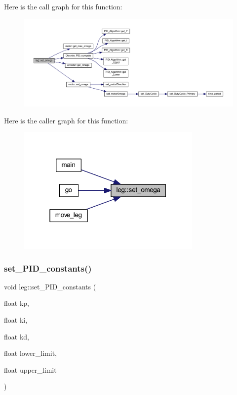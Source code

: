 Here is the call graph for this function\+:
\nopagebreak
\begin{figure}[H]
\begin{center}
\leavevmode
\includegraphics[width=350pt]{classleg_a0b0845622d8b17f34739b390846bf957_cgraph}
\end{center}
\end{figure}
Here is the caller graph for this function\+:
\nopagebreak
\begin{figure}[H]
\begin{center}
\leavevmode
\includegraphics[width=256pt]{classleg_a0b0845622d8b17f34739b390846bf957_icgraph}
\end{center}
\end{figure}
\mbox{\label{classleg_ad783f2af37d09757d3c997f081d12aaf}} 
\subsubsection{\texorpdfstring{set\_PID\_constants()}{set\_PID\_constants()}}
{\footnotesize\ttfamily void leg\+::set\+\_\+\+P\+I\+D\+\_\+constants (\begin{DoxyParamCaption}\item[{float}]{kp,  }\item[{float}]{ki,  }\item[{float}]{kd,  }\item[{float}]{lower\+\_\+limit,  }\item[{float}]{upper\+\_\+limit }\end{DoxyParamCaption})\hspace{0.3cm}{\ttfamily [inline]}}



